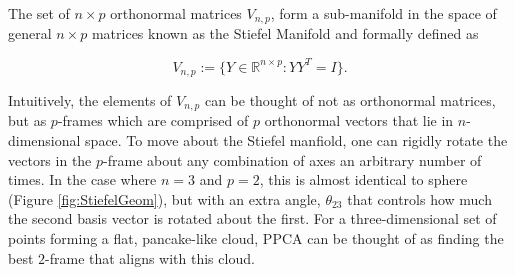 \documentclass{article}
\begin{document}
The set of $n\times p$ orthonormal matrices $V_{n,p}$, form a sub-manifold in the space of general $n \times p$ matrices known as the Stiefel Manifold \citep{muirhead2009aspects} and formally defined as

\begin{equation}
V_{n,p} := \{Y \in \mathbb{R}^{n \times p}: YY^T = I \}.
\end{equation}

Intuitively, the elements of $V_{n,p}$ can be thought of not as orthonormal matrices, but as $p$-frames which are comprised of $p$ orthonormal vectors that lie in $n$-dimensional space. To move about the Stiefel manfiold, one can rigidly rotate the vectors in the $p$-frame about any combination of axes an arbitrary number of times. In the case where $n = 3$ and $p = 2$, this is almost identical to sphere (Figure \ref{fig:StiefelGeom}), but with an extra angle, $\theta_{23}$ that controls how much the second basis vector is rotated about the first. For a three-dimensional set of points forming a flat, pancake-like cloud, PPCA can be thought of as finding the best $2$-frame that aligns with this cloud.
\end{document}
